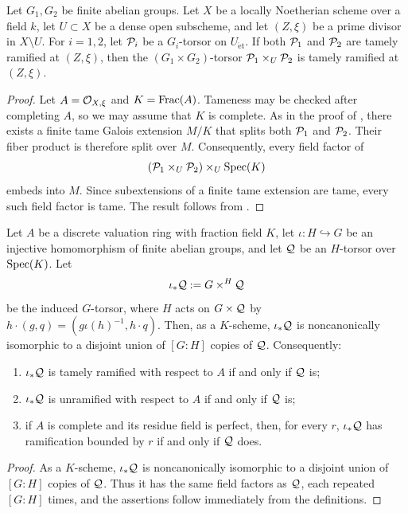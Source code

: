 \begin{lemma}\label{lemma:ramification_of_fiber_product}
    Let $G_1,G_2$ be finite abelian groups. Let $X$ be a locally Noetherian
    scheme over a field $k$, let $U\subset X$ be a dense open subscheme, and
    let $(Z,\xi)$ be a prime divisor in $X\setminus U$. For $i=1,2$, let
    $\mathcal{P}_i$ be a $G_i$-torsor on $U_{\mathrm{\acute et}}$. If both $\mathcal{P}_1$ and
    $\mathcal{P}_2$ are tamely ramified at $(Z,\xi)$, then the
    $(G_1\times G_2)$-torsor $\mathcal{P}_1\times_U\mathcal{P}_2$ is tamely ramified at
    $(Z,\xi)$.
\end{lemma}
\begin{proof}
    Let $A=\mathcal{O}_{X,\xi}$ and $K=\operatorname{Frac}(A)$. Tameness may be checked after
    completing $A$, so we may assume that $K$ is complete. As in the proof of
    , there exists a
    finite tame Galois extension $M/K$ that splits both $\mathcal{P}_1$ and $\mathcal{P}_2$.
    Their fiber product is therefore split over $M$. Consequently, every field
    factor of
    \[
        (\mathcal{P}_1\times_U\mathcal{P}_2)\times_U\operatorname{Spec}(K)
    \]
    embeds into $M$. Since subextensions of a finite tame extension are tame,
    every such field factor is tame. The result follows from
    .
\end{proof}

\begin{lemma}\label{lemma:ramification_of_induced_torsor}
    Let $A$ be a discrete valuation ring with fraction field $K$, let
    $\iota:H\hookrightarrow G$ be an injective homomorphism of finite abelian
    groups, and let $\mathcal{Q}$ be an $H$-torsor over $\operatorname{Spec}(K)$. Let
    \[
        \iota_*\mathcal{Q}:=G\times^H\mathcal{Q}
    \]
    be the induced $G$-torsor, where $H$ acts on $G\times\mathcal{Q}$ by
    $h\cdot(g,q)=(g\iota(h)^{-1},h\cdot q)$. Then, as a $K$-scheme,
    $\iota_*\mathcal{Q}$ is noncanonically isomorphic to a disjoint union of $[G:H]$
    copies of $\mathcal{Q}$. Consequently:
    \begin{enumerate}
        \item $\iota_*\mathcal{Q}$ is tamely ramified with respect to $A$ if and only
        if $\mathcal{Q}$ is;
        \item $\iota_*\mathcal{Q}$ is unramified with respect to $A$ if and only if
        $\mathcal{Q}$ is;
        \item if $A$ is complete and its residue field is perfect, then, for
        every $r$, $\iota_*\mathcal{Q}$ has ramification bounded by $r$ if and only if
        $\mathcal{Q}$ does.
    \end{enumerate}
\end{lemma}
\begin{proof}
    As a $K$-scheme, $\iota_*\mathcal{Q}$ is noncanonically isomorphic to a disjoint
    union of $[G:H]$ copies of $\mathcal{Q}$. Thus it has the same field factors as
    $\mathcal{Q}$, each repeated $[G:H]$ times, and the assertions follow immediately
    from the definitions.
\end{proof}
